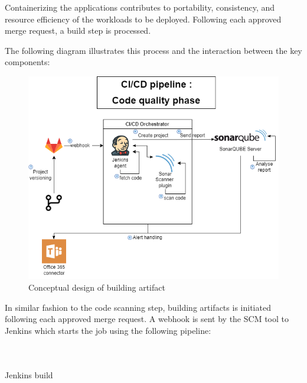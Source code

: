 Containerizing the applications contributes to portability, consistency, and resource efficiency of the workloads to be deployed. Following each approved merge request, a build step is processed. 

The following diagram illustrates this process and the interaction between the key components: 

\begin{figure}[H]\centering
\includegraphics[width=1.0\textwidth,angle=00]{assets/f48.png}
\caption{Conceptual design of building artifact }
\label{fig:Conceptual design of building artifact }
\end{figure}


In similar fashion to the code scanning step, building artifacts is initiated following each approved merge request. A webhook is sent by the SCM tool to Jenkins which starts the job using the following pipeline: 

\begin{listing}[H]
    \inputminted[firstline=1,lastline=40]{Dockerfile}{codeListing/Jenkinsfile_build}
\end{listing}

\begin{listing}[H]
    \inputminted[firstline=41,lastline=75]{Dockerfile}{codeListing/Jenkinsfile_build}
\end{listing}

\begin{listing}[H]
    \inputminted[firstline=76]{Dockerfile}{codeListing/Jenkinsfile_build}
    \caption{Jenkins build}
    \label{lst:jenkinsfile_build}
\end{listing}

